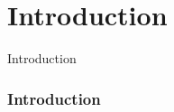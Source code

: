 \section{Introduction}

\frame
{
	\begin{center}
		\LARGE Introduction
	\end{center}
}

\frame
{
	\frametitle{Introduction}
}
